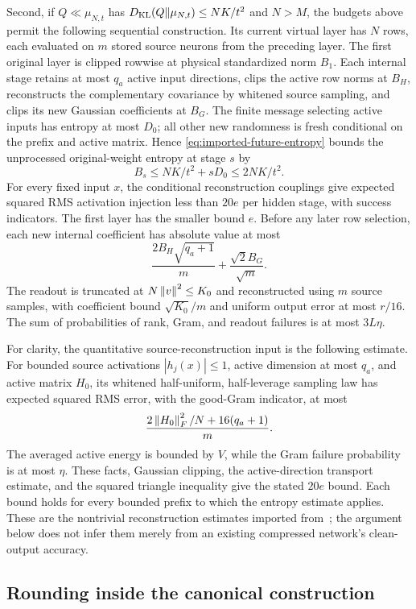 Second, if $Q\ll\mu_{N,t}$ has
$D_{\rm KL}(Q\Vert\mu_{N,t})\le NK/t^2$ and $N>M$, the budgets above
permit the following sequential construction. Its current virtual layer
has $N$ rows, each evaluated on $m$ stored source neurons from the
preceding layer. The first original layer is clipped rowwise at
physical standardized norm $B_1$. Each internal stage retains at most
$q_a$ active input directions, clips the active row norms at $B_H$,
reconstructs the complementary covariance by whitened source sampling,
and clips its new Gaussian coefficients at $B_G$. The finite message
selecting active inputs has entropy at most $D_0$; all other new
randomness is fresh conditional on the prefix and active matrix. Hence
\eqref{eq:imported-future-entropy} bounds the unprocessed original-weight
entropy at stage $s$ by
\[
 B_s\le NK/t^2+sD_0\le2NK/t^2.
\]
For every fixed input $x$, the conditional reconstruction couplings give
expected squared RMS activation injection less than $20e$ per hidden
stage, with success indicators. The first layer has the smaller bound
$e$. Before any later row selection, each new internal coefficient has
absolute value at most
\[
 \frac{2B_H\sqrt{q_a+1}}m+\frac{\sqrt2B_G}{\sqrt m}.
\]
The readout is truncated at $N\left\|v\right\|^2\le K_0$ and reconstructed using
$m$ source samples, with coefficient bound $\sqrt{K_0}/m$ and uniform
output error at most $r/16$. The sum of probabilities of rank, Gram,
and readout failures is at most $3L\eta$.

For clarity, the quantitative source-reconstruction input is the
following estimate. For bounded source activations $|h_j(x)|\le1$,
active dimension at most $q_a$, and active matrix $H_0$, its whitened
half-uniform, half-leverage sampling law has expected squared RMS
error, with the good-Gram indicator, at most
\[
 \frac{2\left\|H_0\right\|_F^2/N+16(q_a+1)}m.
\]
The averaged active energy is bounded by $V$, while the Gram failure
probability is at most $\eta$. These facts, Gaussian clipping, the
active-direction transport estimate, and the squared triangle
inequality give the stated $20e$ bound. Each bound holds for every
bounded prefix to which the entropy estimate applies. These are the
nontrivial reconstruction estimates imported from~\cite{all-scales};
the argument below does not infer them merely from an existing
compressed network's clean-output accuracy.

\subsection{Rounding inside the canonical construction}

